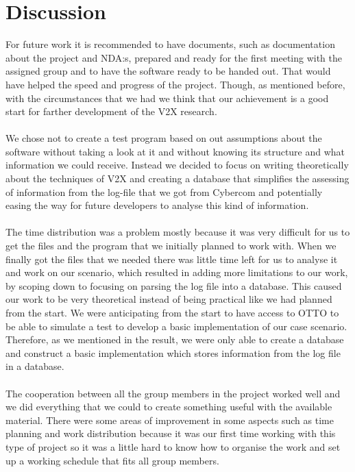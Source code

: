 \section{Discussion}
For future work it is recommended to have documents, such as documentation about the project and NDA:s, prepared and ready for the first meeting with the assigned group and to have the software ready to be handed out. That would have helped the speed and progress of the project. Though, as mentioned before, with the circumstances that we had we think that our achievement is a good start for farther development of the V2X research. 
\paragraph{}
We chose not to create a test program based on out assumptions about the software without taking a look at it and without knowing its structure and what information we could receive. Instead we decided to focus on writing theoretically about the techniques of V2X and creating a database that simplifies the assessing of information from the log-file that we got from Cybercom and potentially easing the way for future developers to analyse this kind of information.

\paragraph{}
The time distribution was a problem mostly because it was very difficult for us to get the files and the program that we initially planned to work with. When we finally got the files that we needed there was little time left for us to analyse it and work on our scenario, which resulted in adding more limitations to our work, by scoping down to focusing on parsing the log file into a database. This caused our work to be very theoretical instead of being practical like we had planned from the start. We were anticipating from the start to have access to OTTO to be able to simulate a test to develop a basic implementation of our case scenario. Therefore, as we mentioned in the result, we were only able to create a database and construct a basic implementation which stores information from the log file in a database. 

\paragraph{}
The cooperation between all the group members in the project worked well and we did everything that we could to create something useful with the available material. There were some areas of improvement in some aspects such as time planning and work distribution because it was our first time working with this type of project so it was a little hard to know how to organise the work and set up a working schedule that fits all group members. 



